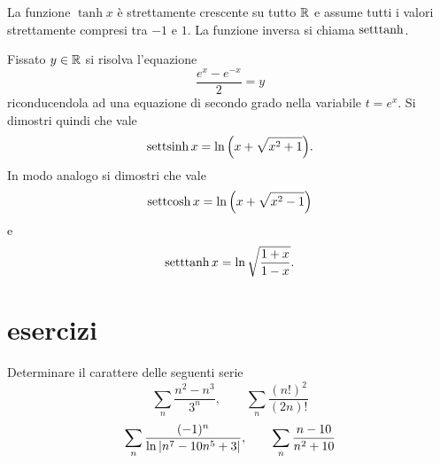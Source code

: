 La funzione $\tanh x$ è strettamente crescente su tutto $\mathbb R$ e assume tutti i valori strettamente compresi tra $-1$ e $1$.
La funzione inversa si chiama $\operatorname{setttanh}$.

\begin{exercise}
Fissato $y\in \mathbb R$ si risolva l'equazione
\[
  \frac{e^x - e^{-x}}{2} = y
\]
riconducendola ad una equazione di secondo grado nella variabile $t=e^x$.
Si dimostri quindi che vale
\[
  \operatorname{settsinh} x = \ln{\left( x + \sqrt{x^2 + 1} \right)}.
\]
In modo analogo si dimostri che vale
\[
  \operatorname{settcosh} x = \ln{\left( x + \sqrt{x^2 - 1} \right)}
\]
e
\[
  \operatorname{setttanh} x = \ln \sqrt{\frac{1+x}{1-x}}.
\]
\end{exercise}


\section{esercizi}
\begin{exercise}
Determinare il carattere delle seguenti serie
\[
  \sum_n \frac{n^2-n^3}{3^n}, \qquad
  \sum_n \frac{(n!)^2}{(2n)!}
\]
\[
\sum_n \frac{(-1)^n}{\ln{\left|n^7 - 10n^5 + 3\right|}},  \qquad
\sum_n \frac{n-10}{n^2+10}
\]
\end{exercise}

